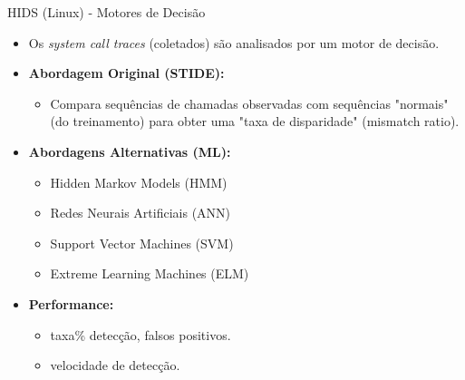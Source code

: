 \begin{frame}{HIDS (Linux) - Motores de Decisão }
    \begin{itemize}
        \item Os \textit{system call traces} (coletados) são analisados por um motor de decisão.

        \item \textbf{Abordagem Original (STIDE):}
              \begin{itemize}

                  \item Compara sequências de chamadas observadas com sequências "normais" (do treinamento) para obter uma "taxa de disparidade" (mismatch ratio).
              \end{itemize}

        \item \textbf{Abordagens Alternativas (ML):}
              \begin{itemize}
                  \item Hidden Markov Models (HMM)
                  \item Redes Neurais Artificiais (ANN)
                  \item Support Vector Machines (SVM)
                  \item Extreme Learning Machines (ELM)
              \end{itemize}

        \item \textbf{Performance:}
              \begin{itemize}
                  \item taxa\% detecção, falsos positivos.
                  \item velocidade de detecção.
              \end{itemize}
    \end{itemize}
\end{frame}

